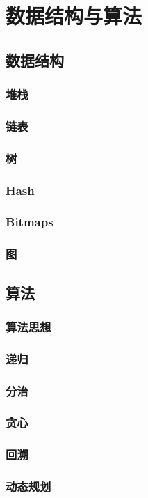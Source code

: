 \chapter{数据结构与算法}

\section{数据结构}

\subsection{堆栈}

\subsection{链表}

\subsection{树}

\subsection{Hash}

\subsection{Bitmaps}

\subsection{图}

\section{算法}

\subsection{算法思想}

\subsection{递归}

\subsection{分治}

\subsection{贪心}

\subsection{回溯}

\subsection{动态规划}
